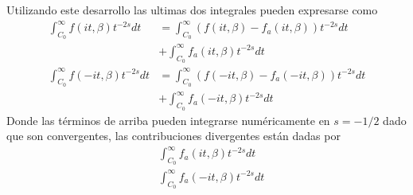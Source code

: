 Utilizando este desarrollo las ultimas dos integrales pueden expresarse como
\begin{align}
\nonumber
	\int _{C _0} ^{\infty}
			f (i t,\beta )
			t ^{-2s}  dt &= 
	\int _{C _0} ^{\infty}
		\left(
			f (it, \beta) - f _a (it, \beta )			
				\right) t ^{-2s} dt 
	\\ &+ 
\nonumber
	\int _{C _0} ^{\infty}
			f _a (i t, \beta)
			 t ^{-2s} dt  \\
\nonumber
	\int _{C _0} ^{\infty}
			f (-i t,\beta )
			t ^{-2s}  dt &= 
	\int _{C _0} ^{\infty}
		\left(
			f (-it, \beta) - f _a (-it, \beta )			
				\right) t ^{-2s} dt 
	\\ &+ 
\nonumber
	\int _{C _0} ^{\infty}
			f _a (-i t, \beta)
			 t ^{-2s} dt
\end{align}
Donde las términos de arriba pueden integrarse numéricamente en $s=-1/2$ dado que son convergentes, las contribuciones divergentes están dadas por
\begin{align}
&	\int _{C _0} ^{\infty}
			f _a (it, \beta )			
			 t ^{-2s} dt 
\\
&	\int _{C _0} ^{\infty}
			f _a (-i t, \beta)
			 t ^{-2s} dt
\end{align}
